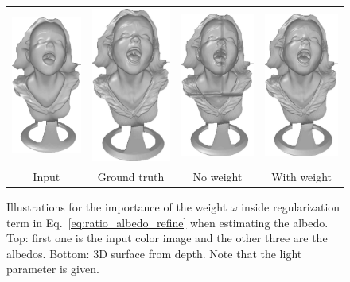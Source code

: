 \begin{figure}[!ht]
{\begin{tabular}{c|c c c}
   \includegraphics[height = 0.32\linewidth]{figures/methodology/ratio_syn_shapeInput.pdf} \hspace{0.1em}
   &\hspace{0.1em}
   \includegraphics[height = 0.32\linewidth]{figures/methodology/ratio_syn_shapeGT.pdf} &
   \includegraphics[height = 0.32\linewidth]{figures/methodology/ratio_syn_shapeNR.pdf} &
   \includegraphics[height = 0.32\linewidth]{figures/methodology/ratio_syn_shapeR.pdf} \\
   {Input} & {Ground truth} & {No weight} &{With weight}                 
 \end{tabular}}
\caption{Illustrations for the importance of the weight $\omega$ inside regularization term in Eq.~\ref{eq:ratio_albedo_refine} when estimating the albedo. Top: first one is the input color image and the other three are the albedos. Bottom: 3D surface from depth. Note that the light parameter is given.}
\label{fig:ratio_albedo_demo}
\end{figure}


